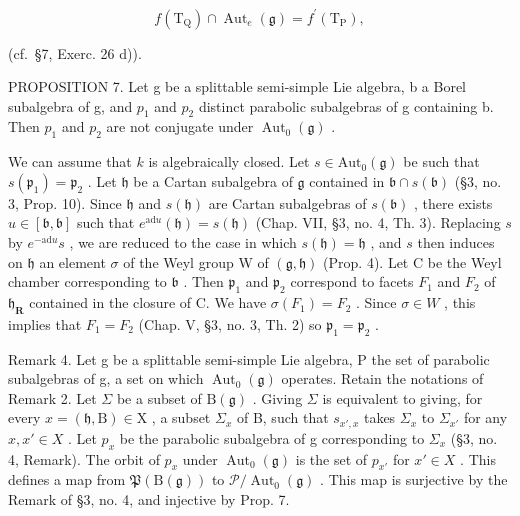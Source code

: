 \[
f (\mathrm{T} _ {\mathrm{Q}}) \cap \operatorname{Aut} _ {e} (\mathfrak {g}) = f ^ {\prime} (\mathrm{T} _ {\mathrm{P}}),
\]

(cf.~§7, Exerc. 26 d)).

PROPOSITION 7. Let g be a splittable semi-simple Lie algebra, b a Borel subalgebra of g, and \(p_{1}\) and \(p_{2}\) distinct parabolic subalgebras of g containing b. Then \(p_{1}\) and \(p_{2}\) are not conjugate under \(\operatorname{Aut}_{0}(\mathfrak{g})\) .

We can assume that \(k\) is algebraically closed. Let \(s \in \mathrm{Aut}_0(\mathfrak{g})\) be such that \(s(\mathfrak{p}_1) = \mathfrak{p}_2\) . Let \(\mathfrak{h}\) be a Cartan subalgebra of \(\mathfrak{g}\) contained in \(\mathfrak{b} \cap s(\mathfrak{b})\) (§3, no. 3, Prop. 10). Since \(\mathfrak{h}\) and \(s(\mathfrak{h})\) are Cartan subalgebras of \(s(\mathfrak{b})\) , there exists \(u \in [\mathfrak{b}, \mathfrak{b}]\) such that \(e^{\mathrm{ad}u}(\mathfrak{h}) = s(\mathfrak{h})\) (Chap. VII, §3, no. 4, Th. 3). Replacing \(s\) by \(e^{-\mathrm{ad}u}s\) , we are reduced to the case in which \(s(\mathfrak{h}) = \mathfrak{h}\) , and \(s\) then induces on \(\mathfrak{h}\) an element \(\sigma\) of the Weyl group W of \((\mathfrak{g}, \mathfrak{h})\) (Prop. 4). Let C be the Weyl chamber corresponding to \(\mathfrak{b}\) . Then \(\mathfrak{p}_1\) and \(\mathfrak{p}_2\) correspond to facets \(F_1\) and \(F_2\) of \(\mathfrak{h}_{\mathbf{R}}\) contained in the closure of C. We have \(\sigma(F_1) = F_2\) . Since \(\sigma \in W\) , this implies that \(F_1 = F_2\) (Chap. V, §3, no. 3, Th. 2) so \(\mathfrak{p}_1 = \mathfrak{p}_2\) .

Remark 4. Let g be a splittable semi-simple Lie algebra, P the set of parabolic subalgebras of g, a set on which \(\operatorname{Aut}_{0}(\mathfrak{g})\) operates. Retain the notations of Remark 2. Let \(\Sigma\) be a subset of \(\mathrm{B}(\mathfrak{g})\) . Giving \(\Sigma\) is equivalent to giving, for every \(x = (\mathfrak{h}, \mathrm{B}) \in \mathrm{X}\) , a subset \(\Sigma_{x}\) of B, such that \(s_{x',x}\) takes \(\Sigma_{x}\) to \(\Sigma_{x'}\) for any \(x, x' \in X\) . Let \(p_{x}\) be the parabolic subalgebra of g corresponding to \(\Sigma_{x}\) (§3, no. 4, Remark). The orbit of \(p_{x}\) under \(\operatorname{Aut}_{0}(\mathfrak{g})\) is the set of \(p_{x'}\) for \(x' \in X\) . This defines a map from \(\mathfrak{P}(\mathrm{B}(\mathfrak{g}))\) to \(\mathcal{P}/\operatorname{Aut}_{0}(\mathfrak{g})\) . This map is surjective by the Remark of §3, no. 4, and injective by Prop. 7.

